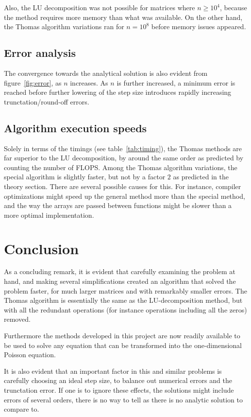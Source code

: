 \documentclass[aps,reprint]{revtex4-1}
\newcommand\blankpage{%
  \null
  \thispagestyle{empty}%
  \addtocounter{page}{-1}%
  \newpage}
\begin{document}
Also, the LU decomposition was not possible for matrices where $n \geq 10^4$,
because the method requires more memory than what was available. On the other hand,
the Thomas algorithm variations ran for $n = 10^8$ before memory issues appeared.

\subsection{Error analysis}
The convergence towards the analytical solution is also evident from figure~\ref{fig:error},
as $n$ increases. As $n$ is further increased, a minimum error is reached
before further lowering of the step size introduces rapidly increasing trunctation/round-off
errors.

\subsection{Algorithm execution speeds}
Solely in terms of the timings (see table~\ref{tab:timing}), the Thomas methods are far superior to the LU decomposition,
by around the same order as predicted by counting the number of FLOPS. Among the
Thomas algorithm variations, the special algorithm is slightly faster, but not
by a factor $2$ as predicted in the theory section. There are several possible
causes for this. For instance, compiler optimizations might speed up the general
method more than the special method, and the way the arrays are passed between
functions might be slower than a more optimal implementation.

\section{Conclusion}
As a concluding remark, it is evident that carefully examining the problem at hand,
and making several simplifications created an algorithm that solved the problem
faster, for much larger matrices and with remarkably smaller errors. The Thomas algorithm is essentially
the same as the LU-decomposition method, but with all the redundant operations (for instance
operations including all the zeros) removed.

Furthermore the methods developed in this project are now readily available to
be used to solve any equation that can be transformed into the one-dimensional
Poisson equation.

It is also evident that an important factor in this and similar problems is carefully choosing an ideal
step size, to balance out numerical errors and the trunctation error. If one is to
ignore these effects, the solutions might include errors of several orders, there is
no way to tell as there is no analytic solution to compare to. 

\blankpage
\appendix
\blankpage
\end{document}
